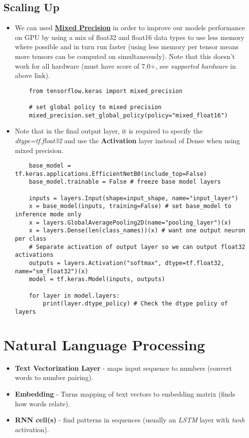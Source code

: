 \documentclass[11pt, a4paper]{article}
\begin{document}
	\subsection{Scaling Up}
	\begin{itemize}
		\item We can used \href{https://www.tensorflow.org/guide/mixed_precision}{\textbf{Mixed Precision}} in order to improve our models performance on GPU by using a mix of float32 and float16 data types to use less memory where possible and in turn run faster (using less memory per tensor means more tensors can be computed on simultaneously). Note that this doesn't work for all hardware (must have score of 7.0+, see \textit{supported hardware} in above link).
	\begin{lstlisting}
	from tensorflow.keras import mixed_precision
	
	# set global policy to mixed precision
	mixed_precision.set_global_policy(policy="mixed_float16") \end{lstlisting}
		\item Note that in the final output layer, it is required to specify the \textit{dtype=tf.float32} and use the \textbf{Activation} layer instead of Dense when using mixed precision.
	\begin{lstlisting}
	base_model = tf.keras.applications.EfficientNetB0(include_top=False)
	base_model.trainable = False # freeze base model layers

	inputs = layers.Input(shape=input_shape, name="input_layer")
	x = base_model(inputs, training=False) # set base_model to inference mode only
	x = layers.GlobalAveragePooling2D(name="pooling_layer")(x)
	x = layers.Dense(len(class_names))(x) # want one output neuron per class 
	# Separate activation of output layer so we can output float32 activations
	outputs = layers.Activation("softmax", dtype=tf.float32, name="sm_float32")(x) 
	model = tf.keras.Model(inputs, outputs)	

	for layer in model.layers:
		print(layer.dtype_policy) # Check the dtype policy of layers\end{lstlisting}
	\end{itemize} \newpage


	\section{Natural Language Processing}
	\begin{itemize}
		\item \textbf{Text Vectorization Layer} - maps input sequence to numbers (convert words to number pairing).
		\item \textbf{Embedding} - Turns mapping of text vectors to embedding matrix (finds how words relate).
		\item \textbf{RNN cell(s)} - find patterns in sequences (usually an \textit{LSTM} layer with \textit{tanh} activation).
	\end{itemize}
	
	
	
	
	
\end{document}
